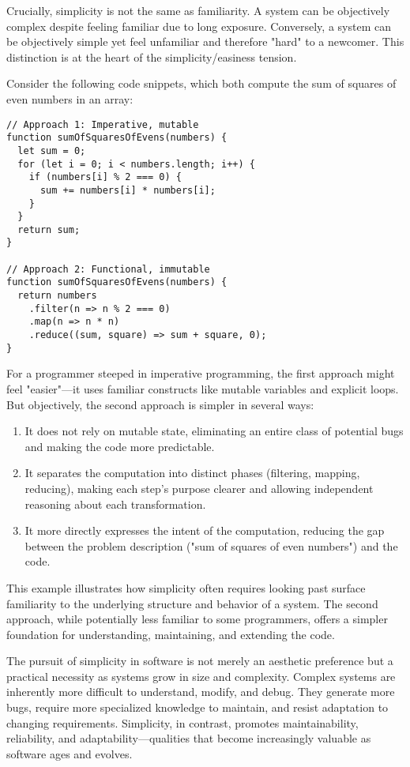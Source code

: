 \documentclass[11pt]{article}
\begin{document}
Crucially, simplicity is not the same as familiarity. A system can be objectively complex despite feeling familiar due to long exposure. Conversely, a system can be objectively simple yet feel unfamiliar and therefore "hard" to a newcomer. This distinction is at the heart of the simplicity/easiness tension.

Consider the following code snippets, which both compute the sum of squares of even numbers in an array:

\begin{verbatim}
// Approach 1: Imperative, mutable
function sumOfSquaresOfEvens(numbers) {
  let sum = 0;
  for (let i = 0; i < numbers.length; i++) {
    if (numbers[i] % 2 === 0) {
      sum += numbers[i] * numbers[i];
    }
  }
  return sum;
}

// Approach 2: Functional, immutable
function sumOfSquaresOfEvens(numbers) {
  return numbers
    .filter(n => n % 2 === 0)
    .map(n => n * n)
    .reduce((sum, square) => sum + square, 0);
}
\end{verbatim}

For a programmer steeped in imperative programming, the first approach might feel "easier"—it uses familiar constructs like mutable variables and explicit loops. But objectively, the second approach is simpler in several ways:

\begin{enumerate}
\item It does not rely on mutable state, eliminating an entire class of potential bugs and making the code more predictable.

\item It separates the computation into distinct phases (filtering, mapping, reducing), making each step's purpose clearer and allowing independent reasoning about each transformation.

\item It more directly expresses the intent of the computation, reducing the gap between the problem description ("sum of squares of even numbers") and the code.
\end{enumerate}

This example illustrates how simplicity often requires looking past surface familiarity to the underlying structure and behavior of a system. The second approach, while potentially less familiar to some programmers, offers a simpler foundation for understanding, maintaining, and extending the code.

The pursuit of simplicity in software is not merely an aesthetic preference but a practical necessity as systems grow in size and complexity. Complex systems are inherently more difficult to understand, modify, and debug. They generate more bugs, require more specialized knowledge to maintain, and resist adaptation to changing requirements. Simplicity, in contrast, promotes maintainability, reliability, and adaptability—qualities that become increasingly valuable as software ages and evolves.
\end{document}
